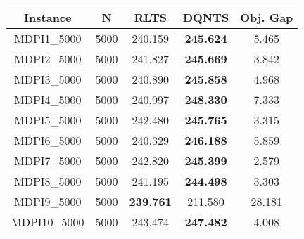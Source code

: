 \begin{center}
\begin{tabular}{ c|c|c|c|c }
  \end{tabular}
  \bigskip
  \begin{tabular}{ c|c|c|c|c }
    \hline
    \textbf{Instance} & \textbf{N} & \textbf{RLTS} & \textbf{DQNTS} & \textbf{Obj. Gap} \\ \hline
    MDPI1\_5000 & 5000 & 240.159 & \textbf{245.624} & 5.465 \\ \hline
    MDPI2\_5000 & 5000 & 241.827 & \textbf{245.669} & 3.842 \\ \hline
    MDPI3\_5000 & 5000 & 240.890 & \textbf{245.858} & 4.968 \\ \hline
    MDPI4\_5000 & 5000 & 240.997 & \textbf{248.330} & 7.333 \\ \hline
    MDPI5\_5000 & 5000 & 242.480 & \textbf{245.765} & 3.315 \\ \hline
    MDPI6\_5000 & 5000 & 240.329 & \textbf{246.188} & 5.859 \\ \hline
    MDPI7\_5000 & 5000 & 242.820 & \textbf{245.399} & 2.579 \\ \hline
    MDPI8\_5000 & 5000 & 241.195 & \textbf{244.498} & 3.303 \\ \hline
    MDPI9\_5000 & 5000 & \textbf{239.761} & 211.580 & 28.181 \\ \hline
    MDPI10\_5000 & 5000 & 243.474 & \textbf{247.482} & 4.008 \\ \hline
  \end{tabular}
\end{center}
